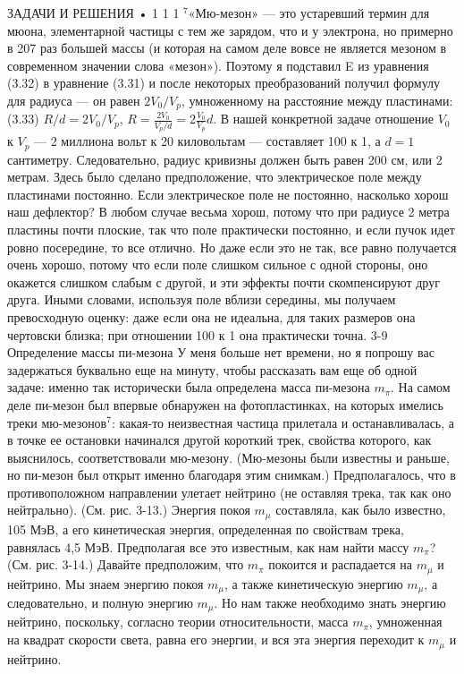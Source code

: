 \documentclass[10pt,oneside]{article}
\begin{document}
ЗАДАЧИ И РЕШЕНИЯ • 1 1 1 \(^7\)«Мю-мезон» --- это устаревший термин для мюона, элементарной частицы с тем же зарядом, что и у электрона, но примерно в 207 раз большей массы (и которая на самом деле вовсе не является мезоном в современном значении слова «мезон»). Поэтому я подставил E из уравнения (3.32) в уравнение (3.31) и после некоторых преобразований получил формулу для радиуса --- он равен \(2V_0/V_p\), умноженному на расстояние между пластинами: (3.33) \(R/d = 2V_0/V_p\), \(R = \frac{2V_0}{V_p/d} = 2 \frac{V_0}{V_p} d\). В нашей конкретной задаче отношение \(V_0\) к \(V_p\) --- 2 миллиона вольт к 20 киловольтам --- составляет 100 к 1, а \(d = 1\) сантиметру. Следовательно, радиус кривизны должен быть равен 200 см, или 2 метрам. Здесь было сделано предположение, что электрическое поле между пластинами постоянно. Если электрическое поле не постоянно, насколько хорош наш дефлектор? В любом случае весьма хорош, потому что при радиусе 2 метра пластины почти плоские, так что поле практически постоянно, и если пучок идет ровно посередине, то все отлично. Но даже если это не так, все равно получается очень хорошо, потому что если поле слишком сильное с одной стороны, оно окажется слишком слабым с другой, и эти эффекты почти скомпенсируют друг друга. Иными словами, используя поле вблизи середины, мы получаем превосходную оценку: даже если она не идеальна, для таких размеров она чертовски близка; при отношении 100 к 1 она практически точна. 3-9 Определение массы пи-мезона У меня больше нет времени, но я попрошу вас задержаться буквально еще на минуту, чтобы рассказать вам еще об одной задаче: именно так исторически была определена масса пи-мезона \(m_\pi\). На самом деле пи-мезон был впервые обнаружен на фотопластинках, на которых имелись треки мю-мезонов\(^7\): какая-то неизвестная частица прилетала и останавливалась, а в точке ее остановки начинался другой короткий трек, свойства которого, как выяснилось, соответствовали мю-мезону. (Мю-мезоны были известны и раньше, но пи-мезон был открыт именно благодаря этим снимкам.) Предполагалось, что в противоположном направлении улетает нейтрино (не оставляя трека, так как оно нейтрально). (См. рис. 3-13.) Энергия покоя \(m_\mu\) составляла, как было известно, 105 МэВ, а его кинетическая энергия, определенная по свойствам трека, равнялась 4,5 МэВ. Предполагая все это известным, как нам найти массу \(m_\pi\)? (См. рис. 3-14.) Давайте предположим, что \(m_\pi\) покоится и распадается на \(m_\mu\) и нейтрино. Мы знаем энергию покоя \(m_\mu\), а также кинетическую энергию \(m_\mu\), а следовательно, и полную энергию \(m_\mu\). Но нам также необходимо знать энергию нейтрино, поскольку, согласно теории относительности, масса \(m_\pi\), умноженная на квадрат скорости света, равна его энергии, и вся эта энергия переходит к \(m_\mu\) и нейтрино.\par
\end{document}
